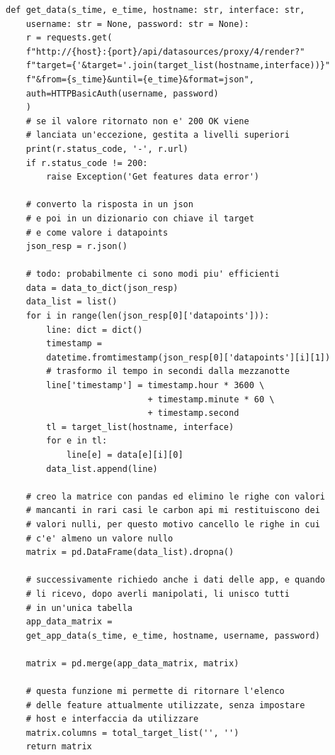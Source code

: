 \begin{lstlisting}[language=python3, label={code:get_data}, caption={Funzione usata per scaricare i dati dal server}]
def get_data(s_time, e_time, hostname: str, interface: str,
    username: str = None, password: str = None):
    r = requests.get(
    f"http://{host}:{port}/api/datasources/proxy/4/render?"
    f"target={'&target='.join(target_list(hostname,interface))}"
    f"&from={s_time}&until={e_time}&format=json",
    auth=HTTPBasicAuth(username, password)
    )
    # se il valore ritornato non e' 200 OK viene
    # lanciata un'eccezione, gestita a livelli superiori
    print(r.status_code, '-', r.url)
    if r.status_code != 200:
        raise Exception('Get features data error')

    # converto la risposta in un json 
    # e poi in un dizionario con chiave il target
    # e come valore i datapoints
    json_resp = r.json()

    # todo: probabilmente ci sono modi piu' efficienti
    data = data_to_dict(json_resp)
    data_list = list()
    for i in range(len(json_resp[0]['datapoints'])):
        line: dict = dict()
        timestamp =
        datetime.fromtimestamp(json_resp[0]['datapoints'][i][1])
        # trasformo il tempo in secondi dalla mezzanotte
        line['timestamp'] = timestamp.hour * 3600 \
                            + timestamp.minute * 60 \
                            + timestamp.second
        tl = target_list(hostname, interface)
        for e in tl:
            line[e] = data[e][i][0]
        data_list.append(line)

    # creo la matrice con pandas ed elimino le righe con valori
    # mancanti in rari casi le carbon api mi restituiscono dei
    # valori nulli, per questo motivo cancello le righe in cui
    # c'e' almeno un valore nullo
    matrix = pd.DataFrame(data_list).dropna()

    # successivamente richiedo anche i dati delle app, e quando
    # li ricevo, dopo averli manipolati, li unisco tutti
    # in un'unica tabella
    app_data_matrix =
    get_app_data(s_time, e_time, hostname, username, password)

    matrix = pd.merge(app_data_matrix, matrix)

    # questa funzione mi permette di ritornare l'elenco 
    # delle feature attualmente utilizzate, senza impostare
    # host e interfaccia da utilizzare
    matrix.columns = total_target_list('', '')
    return matrix

\end{lstlisting}

